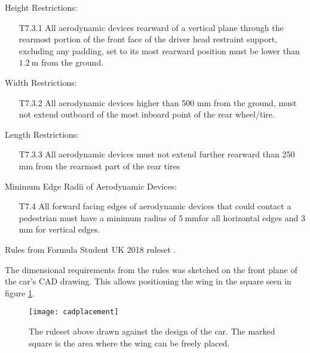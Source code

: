     \begin{tcolorbox}[colframe=seapurple,colback=seapurple!1]
      Height Restrictions:
      \begin{itemize}
        \item[T7.3.1] All aerodynamic devices rearward of a vertical plane through the rearmost portion of the front face of the driver head restraint support, excluding any padding, set to its most rearward position must be lower than $\SI{1.2}{\metre}$ from the ground.
      \end{itemize}

      Width Restrictions:
      \begin{itemize}
       \item [T7.3.2] All aerodynamic devices higher than 500 mm from the ground, must not extend outboard of the most inboard point of the rear wheel/tire.
      \end{itemize}

      Length Restrictions:
      \begin{itemize}
        \item [T7.3.3] All aerodynamic devices must not extend further rearward than 250 mm from the rearmost part of the rear tires
      \end{itemize}

      Minimum Edge Radii of Aerodynamic Devices:
      \begin{itemize}
        \item[T7.4] All forward facing edges of aerodynamic devices that could contact a pedestrian must have a
      minimum radius of $\SI{5}{\milli\metre}$for all horizontal edges and 3 mm for vertical edges.
      \end{itemize}

      \hspace*{\fill}\tiny{Rules from Formula Student UK 2018 ruleset \cite{FSrules18}.}
    \end{tcolorbox}

    The dimensional requirements from the rules was sketched on the front plane of the car's CAD drawing. This allows positioning the wing in the square seen in figure \ref{fig:cadplacement}.

    \begin{figure}
      \texttt{[image: cadplacement]}
      \caption{The ruleset above drawn against the design of the car. The marked square is the area where the wing can be freely placed.}
      \label{fig:cadplacement}
    \end{figure}

